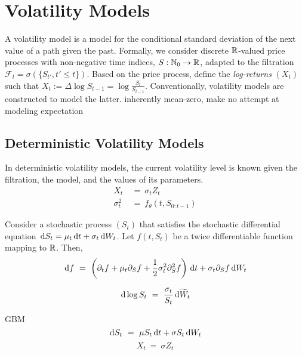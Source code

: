 \chapter{Volatility Models}
\label{sec:models}

A volatility model is a model for the conditional standard deviation of the next value of a path given the past. Formally, we consider discrete $\mathbb{R}$-valued price processes with non-negative time indices, $S: \mathbb{N}_0 \to \mathbb{R}$, adapted to the filtration $\mathcal{F}_t = \sigma(\{S_{t'}, t' \leq t\})$. Based on the price process, define the \emph{log-returns} $(X_t)$ such that $X_t := \Delta \log S_{t-1} = \log \frac{S_t}{S_{t-1}}$. Conventionally, volatility models are constructed to model the latter.
inherently mean-zero, make no attempt at modeling expectation


\section{Deterministic Volatility Models}

In deterministic volatility models, the current volatility level is known given the filtration, the model, and the values of its parameters.
\begin{align*}
X_t ~ &= ~ \sigma_t Z_t \\
\sigma_t^2 ~ &= ~ f_\theta(t, S_{0:t-1})
\end{align*}

\begin{lemma}
Consider a stochastic process $(S_t)$ that satisfies the stochastic differential equation $\, \textrm{d} S_t = \mu_t \, \textrm{d} t + \sigma_t \, \textrm{d} W_t$. Let $f(t, S_t)$ be a twice differentiable function mapping to $\mathbb{R}$. Then,
\begin{equation*}
\, \textrm{d} f ~ = ~ \left( \partial_t f + \mu_t \partial_S f + \frac{1}{2} \sigma_t^2 \partial^2_S f \right) \, \textrm{d} t + \sigma_t \partial_S f \, \textrm{d} W_t
\end{equation*}
\end{lemma}

\begin{equation*}
\, \textrm{d} \log S_t ~ = ~ \frac{\sigma_t}{S_t} \, \textrm{d} \widetilde{W}_t
\end{equation*}

GBM
\begin{equation*}
\, \textrm{d} S_t ~ = ~ \mu S_t \, \textrm{d} t + \sigma S_t \, \textrm{d} W_t
\end{equation*}
\begin{equation*}
X_t ~ = ~ \sigma Z_t
\end{equation*}

